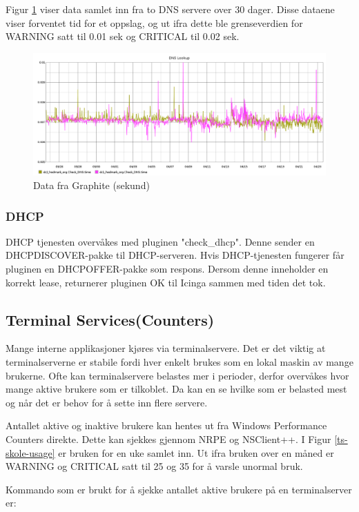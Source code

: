 Figur \ref{dns-inv} viser data samlet inn fra to DNS servere over 30 dager. Disse dataene viser forventet tid for et oppslag, og ut ifra dette ble grenseverdien for WARNING satt til 0.01 sek og CRITICAL til 0.02 sek.

\begin{figure}[H]
    \centering
    \includegraphics[width=1.0\textwidth]{img/dns-inv}
    \caption{Data fra Graphite (sekund)}
    \label{dns-inv}
\end{figure}

\subsubsection*{DHCP}
DHCP tjenesten overvåkes med pluginen "check\_dhcp". Denne sender en DHCPDISCOVER-pakke til DHCP-serveren. Hvis DHCP-tjenesten fungerer får pluginen en DHCPOFFER-pakke som respons. Dersom denne inneholder en korrekt lease, returnerer pluginen OK til Icinga sammen med tiden det tok.

\subsection{Terminal Services(Counters)}
Mange interne applikasjoner kjøres via terminalservere. Det er det viktig at terminalserverne er stabile fordi hver enkelt brukes som en lokal maskin av mange brukerne. Ofte kan terminalservere belastes mer i perioder, derfor overvåkes hvor mange aktive brukere som er tilkoblet. Da kan en se hvilke som er belasted mest og når det er behov for å sette inn flere servere.

Antallet aktive og inaktive brukere kan hentes ut fra Windows Performance Counters direkte. Dette kan sjekkes gjennom NRPE og NSClient++. I Figur \ref{ts-skole-usage} er bruken for en uke samlet inn. Ut ifra bruken over en måned er WARNING og CRITICAL satt til 25 og 35 for å varsle unormal bruk.

Kommando som er brukt for å sjekke antallet aktive brukere på en terminalserver er:
 
